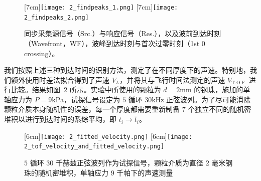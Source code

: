 \begin{figure}[!hbtp]
  \centering
                  [7cm]{\texttt{[image: 2\_findpeaks\_1.png]}}
  \hspace{1cm}
                  [7cm]{\texttt{[image: 2\_findpeaks\_2.png]}}
  \caption{同步采集源信号（Src.）与响应信号（Res.），以及波前到达时刻（Wavefront，WF），波峰到达时刻与首次过零时刻（1st 0 crossing）。}
  \label{fig:reference_point}
\end{figure}

我们按照上述三种到达时间的识别方法，测定了在不同厚度下的声速。特别地，我们额外使用时差法拟合得到了声速 $V_{L}$，并将其与飞行时间法测定的声速 $V_{\text{T.O.F.}}$ 进行比较。结果如图~\ref{fig:sound_velocity_measurement} 所示。实验中所使用的颗粒为 $d=2\unit{\milli\meter}$ 的钢珠，施加的单轴应力为 $P=9\unit{\kilo\Pa}$，试探信号设定为 $5$ 循环 $30\unit{\kilo\Hz}$ 正弦波列。为了尽可能消除颗粒介质本身随机性的误差，每一个厚度都需要重新制备 $7$ 个独立不同的随机密堆积以进行到达时间的系综平均，即 $t_{i}\rightarrow \bar{t}_{i}$。

\begin{figure}[!hbtp]
  \centering
                  [6cm]{\texttt{[image: 2\_fitted\_velocity.png]}}
  \hspace{1cm}
                  [6cm]{\texttt{[image: 2\_tof\_velocity\_and\_fitted\_velocity.png]}}
  \caption{$5$ 循环 $30$ 千赫兹正弦波列作为试探信号，颗粒介质为直径 $2$ 毫米钢珠的随机密堆积，单轴应力 $9$ 千帕下的声速测量}
  \label{fig:sound_velocity_measurement}
\end{figure}

